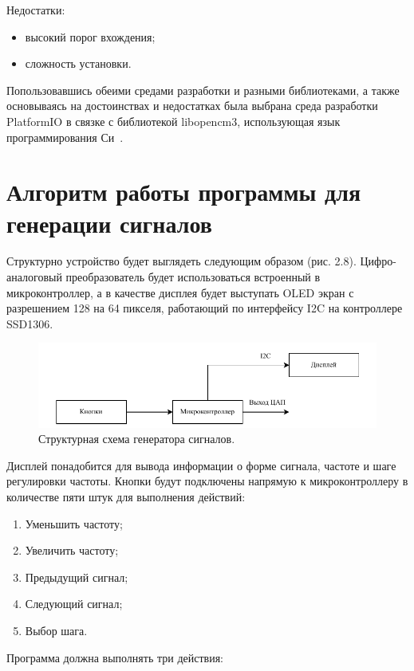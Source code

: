 	Недостатки:
	\begin{itemize}
		\item высокий порог вхождения;
		\item сложность установки.
	\end{itemize}

	Попользовавшись обеими средами разработки и разными библиотеками, а также основываясь на достоинствах и недостатках была выбрана среда разработки PlatformIO в связке с библиотекой libopencm3, использующая язык программирования Си~\cite{ckd, cdh}.


\section{Алгоритм работы программы для генерации сигналов}

	Структурно устройство будет выглядеть следующим образом (рис. 2.8). Цифро-аналоговый преобразователь будет использоваться встроенный в микроконтроллер, а в качестве дисплея будет выступать OLED экран с разрешением 128 на 64 пикселя, работающий по интерфейсу I2C на контроллере SSD1306.
	
	\begin{figure}[H]
    \centering
    \includegraphics[width=1\textwidth]{../image/struct_gen.pdf}
    \caption{Структурная схема генератора сигналов.}
	\end{figure}
	
	Дисплей понадобится для вывода информации о форме сигнала, частоте и шаге регулировки частоты. Кнопки будут подключены напрямую к микроконтроллеру в количестве пяти штук для выполнения действий:
	\begin{enumerate}
		\item Уменьшить частоту;
		\item Увеличить частоту;
		\item Предыдущий сигнал;
		\item Следующий сигнал;
		\item Выбор шага.
	\end{enumerate}

	Программа должна выполнять три действия:
	
